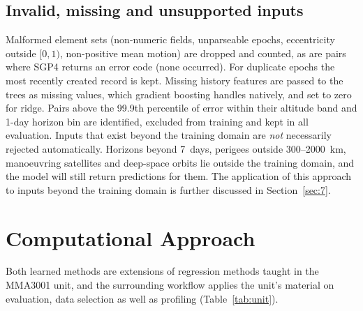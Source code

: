 \documentclass[11pt, a4paper]{article}
\begin{document}
\subsection{Invalid, missing and unsupported inputs}

Malformed element sets (non-numeric fields, unparseable epochs, eccentricity outside $[0,1)$, non-positive mean motion) are dropped and counted, as are pairs where SGP4 returns an error code (none occurred). For duplicate epochs the most recently created record is kept. Missing history features are passed to the trees as missing values, which gradient boosting handles natively, and set to zero for ridge. Pairs above the 99.9th percentile of error within their altitude band and 1-day horizon bin are identified, excluded from training and kept in all evaluation. Inputs that exist beyond the training domain are \emph{not} necessarily rejected automatically. Horizons beyond 7~days, perigees outside 300--2000~km, manoeuvring satellites and deep-space orbits lie outside the training domain, and the model will still return predictions for them. The application of this approach to inputs beyond the training domain is further discussed in Section~\ref{sec:7}.

\section{Computational Approach}\label{sec:3}

Both learned methods are extensions of regression methods taught in the MMA3001 unit, and the surrounding workflow applies the unit's material on evaluation, data selection as well as profiling (Table~\ref{tab:unit}).
\end{document}
